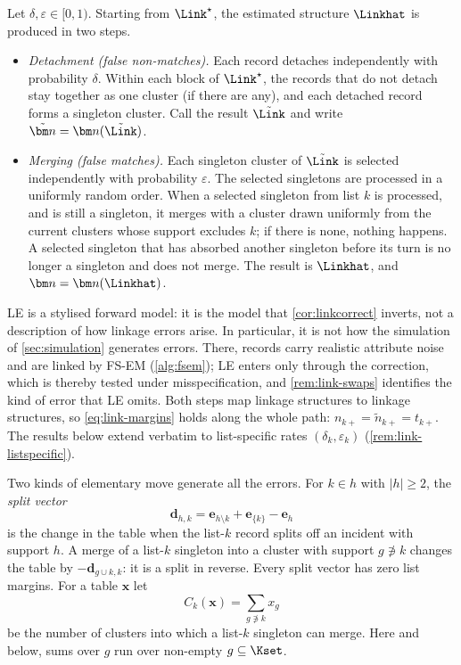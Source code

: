 \begin{definition}\label{def:link-le}
Let $\delta,\varepsilon\in[0,1)$. Starting from $\Link^\star$, the estimated structure $\Linkhat$ is produced in two steps.
\begin{itemize}[leftmargin=4.2em]
  \item[(LE-D)] \emph{Detachment (false non-matches).} Each record detaches independently with probability $\delta$. Within each block of $\Link^\star$, the records that do not detach stay together as one cluster (if there are any), and each detached record forms a singleton cluster. Call the result $\tilde\Link$ and write $\tilde{\bm n}=\bm n(\tilde\Link)$.
  \item[(LE-M)] \emph{Merging (false matches).} Each singleton cluster of $\tilde\Link$ is selected independently with probability $\varepsilon$. The selected singletons are processed in a uniformly random order. When a selected singleton from list $k$ is processed, and is still a singleton, it merges with a cluster drawn uniformly from the current clusters whose support excludes $k$; if there is none, nothing happens. A selected singleton that has absorbed another singleton before its turn is no longer a singleton and does not merge. The result is $\Linkhat$, and $\bm n=\bm n(\Linkhat)$.
\end{itemize}
\end{definition}

LE is a stylised forward model: it is the model that \cref{cor:linkcorrect} inverts, not a description of how linkage errors arise. In particular, it is not how the simulation of \cref{sec:simulation} generates errors. There, records carry realistic attribute noise and are linked by FS-EM (\cref{alg:fsem}); LE enters only through the correction, which is thereby tested under misspecification, and \cref{rem:link-swaps} identifies the kind of error that LE omits. Both steps map linkage structures to linkage structures, so \eqref{eq:link-margins} holds along the whole path: $n_{k+}=\tilde n_{k+}=t_{k+}$. The results below extend verbatim to list-specific rates $(\delta_k,\varepsilon_k)$ (\cref{rem:link-listspecific}).

Two kinds of elementary move generate all the errors. For $k\in h$ with $|h|\ge2$, the \emph{split vector}
\[
  \bm d_{h,k}=\bm e_{h\setminus k}+\bm e_{\{k\}}-\bm e_h
\]
is the change in the table when the list-$k$ record splits off an incident with support $h$. A merge of a list-$k$ singleton into a cluster with support $g\not\ni k$ changes the table by $-\bm d_{g\cup k,k}$: it is a split in reverse. Every split vector has zero list margins. For a table $\bm x$ let
\[
  C_k(\bm x)=\sum_{g\not\ni k}x_g
\]
be the number of clusters into which a list-$k$ singleton can merge. Here and below, sums over $g$ run over non-empty $g\subseteq\Kset$.

